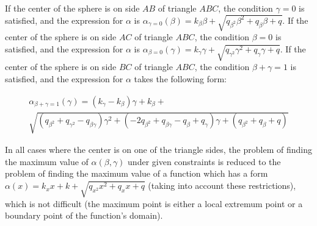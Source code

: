 \documentclass[
11pt,%
tightenlines,%
twoside,%
onecolumn,%
nofloats,%
nobibnotes,%
nofootinbib,%
superscriptaddress,%
noshowpacs,%
centertags]%
{revtex4-2}
\begin{document}
If the center of the sphere is on side $AB$ of triangle $ABC$, the condition $\gamma = 0$ is satisfied, and the expression for $\alpha$ is $\alpha_{\gamma = 0}(\beta) = k_{\beta} \beta + \sqrt{q_{\beta^2} \beta^2 + q_{\beta} \beta + q}$.
If the center of the sphere is on side $AC$ of triangle $ABC$, the condition $\beta = 0$ is satisfied, and the expression for $\alpha$ is $\alpha_{\beta = 0}(\gamma) = k_{\gamma} \gamma + \sqrt{q_{\gamma^2} \gamma^2 + q_{\gamma} \gamma + q}$.
If the center of the sphere is on side $BC$ of triangle $ABC$, the condition $\beta + \gamma = 1$ is satisfied, and the expression for $\alpha$ takes the following form:

\begin{multline}
\alpha_{\beta + \gamma = 1}(\gamma) = (k_{\gamma} - k_{\beta}) \gamma + k_{\beta} + \\
\sqrt{(q_{\beta^2} + q_{\gamma^2} - q_{\beta \gamma}) \gamma^2 + (-2 q_{\beta^2} + q_{\beta \gamma} - q_{\beta} + q_{\gamma}) \gamma + (q_{\beta^2} + q_{\beta} + q)}
\end{multline}

In all cases where the center is on one of the triangle sides, the problem of finding the maximum value of $\alpha(\beta, \gamma)$ under given constraints is reduced to the problem of finding the maximum value of a function which has a form $\alpha(x) = k_x x + k + \sqrt {q_{x^2} x^2 + q_x x + q}$ (taking into account these restrictions), which is not difficult (the maximum point is either a local extremum point or a boundary point of the function's domain).
\end{document}

